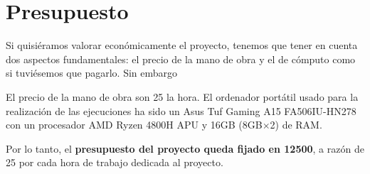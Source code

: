 \section{Presupuesto}

Si quisiéramos valorar económicamente el proyecto, tenemos que tener en cuenta dos aspectos fundamentales: el precio de la mano de obra y el de cómputo como si tuviésemos que pagarlo. 
Sin embargo

El precio de la mano de obra son 25\texteuro\xspace la hora. 
El ordenador portátil usado para la realización de las ejecuciones ha sido un Asus Tuf Gaming A15 FA506IU-HN278 con un procesador AMD\textregistered\xspace Ryzen\texttrademark\xspace 7 4800H APU
y 16GB (8GB$\times$2) de RAM.

Por lo tanto, el \textbf{presupuesto del proyecto queda fijado en 12500\texteuro\xspace}, a razón de 25\texteuro\xspace por cada hora de trabajo dedicada al proyecto.